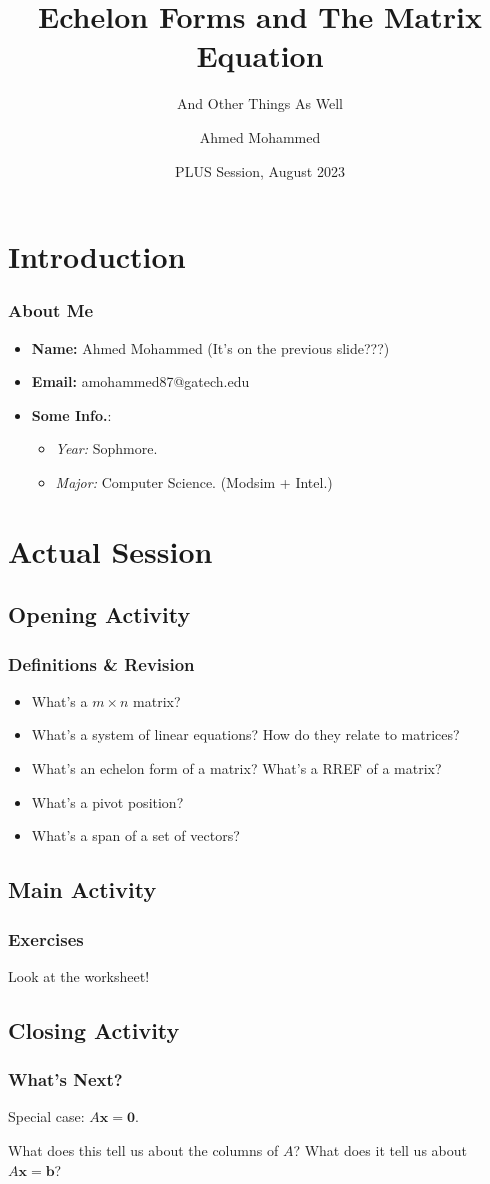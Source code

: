 \documentclass{beamer}
\title{Echelon Forms and The Matrix Equation}
\subtitle{And Other Things As Well}
\author{Ahmed Mohammed}
\date{PLUS Session, August 2023}
\institute{Georgia Institute of Technology}
\renewcommand{\vec}[1]{\bm{#1}}
\begin{document}
	\begin{frame}
		\maketitle
	\end{frame}
	
	\section{Introduction}
	\begin{frame}
		\frametitle{About Me}
		\pause
		\begin{itemize}
			\item \textbf{Name:} Ahmed Mohammed \pause (It's on the previous slide???)
			\item<4-> \textbf{Email:} amohammed87@gatech.edu
			\item<5-> \textbf{Some Info.}:
				\begin{itemize}
					\item \textit{Year:} Sophmore.
					\item \textit{Major:} Computer Science. (Modsim + Intel.)
				\end{itemize}
		\end{itemize}				
	\end{frame}
	
	\section{Actual Session}
	\subsection{Opening Activity}
	\begin{frame}
		\frametitle{Definitions \& Revision}
		\begin{itemize}[<+(1)->]
			\item What's a \(m \times n\) matrix?
			\item What's a system of linear equations? How do they relate to matrices?
			\item What's an echelon form of a matrix? What's a RREF of a matrix?
			\item What's a pivot position?
			\item What's a span of a set of vectors?
		\end{itemize}
	\end{frame}

	\subsection{Main Activity}
	\begin{frame}
		\frametitle{Exercises}
		\centering
		Look at the worksheet!
	\end{frame}

	\subsection{Closing Activity}
	\begin{frame}
		\frametitle{What's Next?}
		Special case: \(A\vec{x} = \vec{0}\). \pause
		\vspace{2.5mm}

		What does this tell us about the columns of \(A\)? What does it tell us about \(A\vec{x} = \vec{b}\)?		
	\end{frame}
\end{document}
